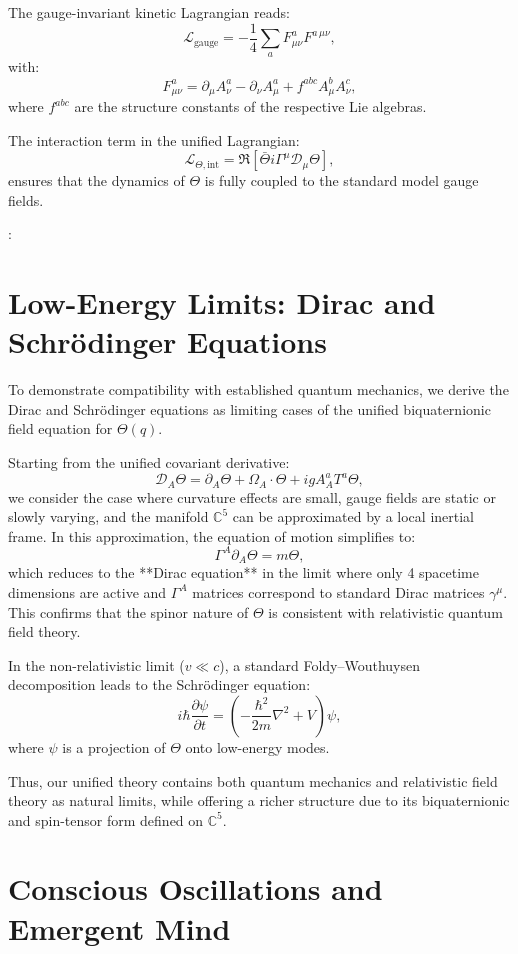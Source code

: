 \documentclass[12pt]{article}
\begin{document}
The gauge-invariant kinetic Lagrangian reads:
\[
\mathcal{L}_{\text{gauge}} = -\frac{1}{4} \sum_a F^{a}_{\mu\nu} F^{a\,\mu\nu},
\]
with:
\[
F^a_{\mu\nu} = \partial_\mu A^a_\nu - \partial_\nu A^a_\mu + f^{abc} A^b_\mu A^c_\nu,
\]
where \(f^{abc}\) are the structure constants of the respective Lie algebras.

The interaction term in the unified Lagrangian:
\[
\mathcal{L}_{\Theta, \text{int}} = \Re \left[ \bar{\Theta} i \Gamma^\mu \mathcal{D}_\mu \Theta \right],
\]
ensures that the dynamics of \(\Theta\) is fully coupled to the standard model gauge fields.

:\section{Low-Energy Limits: Dirac and Schrödinger Equations}

To demonstrate compatibility with established quantum mechanics, we derive the Dirac and Schrödinger equations as limiting cases of the unified biquaternionic field equation for \(\Theta(q)\).

Starting from the unified covariant derivative:
\[
\mathcal{D}_A \Theta = \partial_A \Theta + \Omega_A \cdot \Theta + i g A_A^a T^a \Theta,
\]
we consider the case where curvature effects are small, gauge fields are static or slowly varying, and the manifold \(\mathbb{C}^5\) can be approximated by a local inertial frame. In this approximation, the equation of motion simplifies to:
\[
\Gamma^A \partial_A \Theta = m \Theta,
\]
which reduces to the **Dirac equation** in the limit where only 4 spacetime dimensions are active and \(\Gamma^A\) matrices correspond to standard Dirac matrices \(\gamma^\mu\). This confirms that the spinor nature of \(\Theta\) is consistent with relativistic quantum field theory.

In the non-relativistic limit (\(v \ll c\)), a standard Foldy–Wouthuysen decomposition leads to the Schrödinger equation:
\[
i \hbar \frac{\partial \psi}{\partial t} = \left( -\frac{\hbar^2}{2m} \nabla^2 + V \right) \psi,
\]
where \(\psi\) is a projection of \(\Theta\) onto low-energy modes.

Thus, our unified theory contains both quantum mechanics and relativistic field theory as natural limits, while offering a richer structure due to its biquaternionic and spin-tensor form defined on \(\mathbb{C}^5\).

\section{Conscious Oscillations and Emergent Mind}
\end{document}
